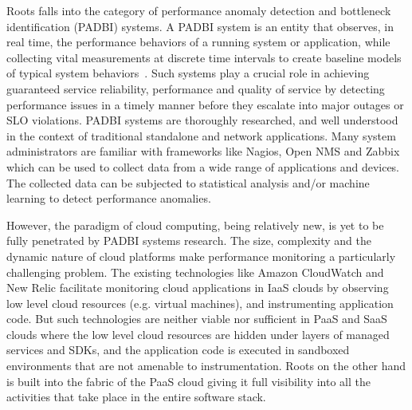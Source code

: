 Roots falls into the category of performance anomaly detection and bottleneck identification (PADBI) systems.
A PADBI system is an entity that observes, in real time, the performance behaviors
of a running system or application, while collecting vital measurements at discrete time intervals to create baseline
models of typical system behaviors~\cite{Ibidunmoye:2015:PAD:2808687.2791120}. 
Such systems play a crucial role in achieving guaranteed service reliability, performance and
quality of service by detecting performance issues in a timely manner before they escalate into major outages
or SLO violations. PADBI systems are thoroughly researched, and well understood in the context of traditional standalone and
network applications. Many system administrators are familiar with frameworks like Nagios, Open NMS and Zabbix which
can be used to collect data from a wide range of applications and devices. The collected data can be
subjected to statistical analysis and/or machine learning to detect performance anomalies. 

However, the paradigm of cloud computing, being relatively new, is yet to be
fully penetrated by PADBI systems research. The size, complexity and the dynamic nature of 
cloud platforms make performance monitoring a particularly challenging problem.
The existing technologies like Amazon CloudWatch
and New Relic facilitate monitoring cloud applications in IaaS clouds by observing low level
cloud resources (e.g. virtual machines), and instrumenting application code. But such technologies
are neither viable nor sufficient in
PaaS and SaaS clouds where the low level cloud resources are hidden under layers of managed
services and SDKs, and the application code is executed in sandboxed environments that are not
amenable to instrumentation. Roots on the other hand is built into the 
fabric of the PaaS cloud giving it full visibility into all the activities that take place in the entire
software stack.

